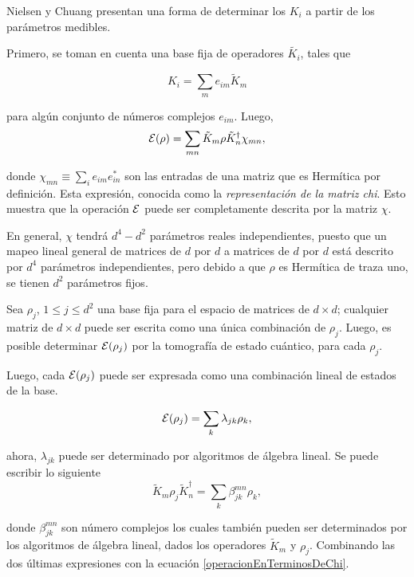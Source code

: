 Nielsen y Chuang {\cite{nielsen_chuang_2010}} presentan una forma de determinar los $K_i$  a partir de los parámetros medibles.

Primero, se toman en cuenta una base fija de operadores $\tilde{K_i}$, tales que 

\begin{equation}\label{Basefija}
    K_i=\sum_m e_{im}\tilde{K}_m
\end{equation}

para algún conjunto de números complejos $e_{im}$. Luego, 
\begin{equation}\label{operacionEnTerminosDeChi}
    \mathcal{E}(\rho)=\sum_{mn}\tilde{K}_m\rho \tilde{K}_n^\dagger \chi_{mn},
\end{equation}

donde $\chi_{mn}\equiv \sum_i e_{im}e_{in}^*$ son las entradas de una matriz que es Hermítica por definición. Esta expresión, conocida como la \textit{representación de la matriz chi}. Esto muestra que la operación $\mathcal{E}$ puede ser completamente descrita por la matriz $\chi$.

En general, $\chi$ tendrá $d^4-d^2$ parámetros reales independientes, puesto que un mapeo lineal general de matrices de $d$ por $d$ a matrices de $d$ por $d$ está descrito por $d^4$ parámetros independientes, pero debido a que $\rho$ es Hermítica de traza uno, se tienen $d^2$ parámetros fijos.

Sea $\rho_j$, $1 \le j\le d^2$ una base fija para el espacio de matrices de $d\times d$; cualquier matriz de $d\times d$ puede ser escrita como una única combinación de $\rho_j$. Luego, es posible determinar $\mathcal{E}(\rho_j)$ por la tomografía de estado cuántico, para cada $\rho_j$.

Luego, cada $\mathcal{E}(\rho_j)$ puede ser expresada como una combinación lineal de estados de la base.

\begin{equation}\label{E_en_terminos_de_la_base}
    \mathcal{E}(\rho_j)=\sum_k \lambda _{jk}\rho_k,
\end{equation}

ahora, $\lambda_{jk}$ puede ser determinado por algoritmos de álgebra lineal. Se puede escribir lo siguiente
\begin{equation}
    \tilde{K}_m\rho_j \tilde{K}_n^\dagger=\sum_k\beta_{jk}^{mn}\rho_k,
\end{equation}

donde $\beta_{jk}^{mn}$ son número complejos los cuales también pueden ser determinados por los algoritmos de álgebra lineal, dados los operadores $\tilde{K}_m$ y $\rho_j$.  Combinando las dos últimas expresiones con la ecuación {\ref{operacionEnTerminosDeChi}}.


